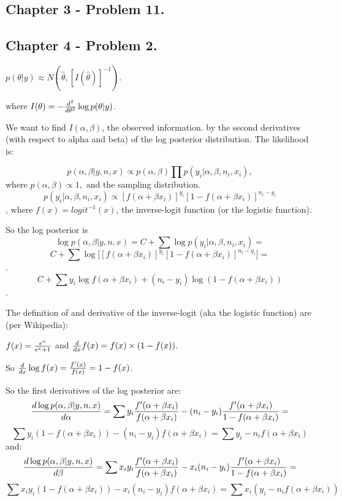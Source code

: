 \documentclass{article}
\begin{document}
\subsection{Chapter 3 - Problem 11.}

\subsection{Chapter 4 - Problem 2.}

\(p(\theta \vert y) \approx N(\hat{\theta}, [I(\hat{\theta})]^{-1})\).

where \(I(\theta) = -{d^2 \over d\theta^2}\log p(\theta \vert y)\).

We want to find \(I(\alpha, \beta)\), the observed information.
by the second derivatives (with respect to alpha and beta)
of the log posterior distribution. The likelihood is:

\[p(\alpha, \beta \vert y, n, x) \propto p(\alpha, \beta) 
\prod p(y_i \vert \alpha, \beta, n_i, x_i),\]
where \(p(\alpha, \beta) \propto 1,\) and the sampling distribution.
\[p(y_i \vert \alpha, \beta, n_i, x_i) \propto [f(\alpha + \beta x_i)]^{y_i}
[1 - f(\alpha + \beta x_i)]^{n_i - y_i}\], where \(f(x) = logit^{-1}(x)\), the
inverse-logit function (or the logistic function).

So the log posterior is
\[\log p(\alpha, \beta \vert y, n, x) = 
C + \sum \log p(y_i \vert \alpha, \beta, n_i, x_i) =\]
\[C +  \sum \log \big[ [f(\alpha + \beta x_i)]^{y_i}
[1 - f(\alpha + \beta x_i)]^{n_i - y_i}\big] = \].
\[ C + \sum y_i \log f(\alpha + \beta x_i) +
(n_i - y_i)\log (1 - f(\alpha + \beta x_i))\].

The definition of 
and derivative of the inverse-logit (aka the logistic function) are
(per Wikipedia):

\(f(x) = {e^x \over e^x + 1}\) and \({d \over dx} f(x) = f(x)\times (1 - f(x))\).

So \({d \over dx} \log f(x) = {f'(x)\over f(x)} = 1 - f(x) \).

So the first derivatives of the log posterior are:
\[{d \log p(\alpha, \beta \vert y, n, x) \over d\alpha} = 
\sum y_i {f'(\alpha + \beta x_i) \over f(\alpha + \beta x_i)} -
(n_i - y_i){f'(\alpha + \beta x_i) \over 1 - f(\alpha + \beta x_i)} = \]
\[\sum y_i (1 - f(\alpha + \beta x_i)) -
(n_i - y_i)f(\alpha + \beta x_i) =
\sum y_i - n_i f(\alpha + \beta x_i)\]
and:
\[{d \log p(\alpha, \beta \vert y, n, x) \over d\beta} = 
\sum x_i y_i {f'(\alpha + \beta x_i) \over f(\alpha + \beta x_i)} -
x_i (n_i - y_i){f'(\alpha + \beta x_i) \over 1 - f(\alpha + \beta x_i)} = \]
\[\sum x_i y_i (1 - f(\alpha + \beta x_i)) -
x_i (n_i - y_i)f(\alpha + \beta x_i) =
\sum x_i (y_i - n_i f(\alpha + \beta x_i))\]
\end{document}
